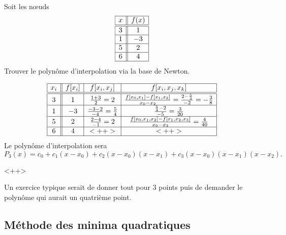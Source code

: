 \begin{example}

    Soit les nœuds
    \begin{equation*}
        \begin{array}[]{|c||c|}
            \hline
            x&f(x)\\
            \hline\hline
            3&1\\
            \hline
            1&-3\\
            \hline
            5&2\\
            \hline
            6&4\\
            \hline
        \end{array}
    \end{equation*}
    Trouver le polynôme d'interpolation via la base de Newton.


    \begin{equation*}
        \begin{array}[]{|c||c|c|c|}
            \hline
            x_i&f[x_i]&f[x_i,x_j]&f[x_i,x_j,x_k]\\
            \hline\hline
            3&1&\frac{ 1+3 }{ 2 }=2&\frac{ f[x_0,x_1]-f[x_1,x_2] }{ x_0-x_2 }=\frac{ 2-\frac{ 5 }{ 4 } }{ -2 }=-\frac{ 3 }{ 8 }\\
            \hline
            1&-3&\frac{ -3-2 }{ -4 }=\frac{ 5 }{ 4 }&\frac{ \frac{ 5 }{ 4 }-2 }{ -5 }=\frac{ 3 }{ 20 }\\
            \hline
            5&2&\frac{ 2-4 }{ -1 }=2&\frac{ f[x_0,x_1,x_2]-f[x_1,x_2,x_3] }{ x_0-x_3 }=\frac{ 4 }{ 40 }\\
            \hline
            6&4&<++>&<++>\\
            \hline
        \end{array}
    \end{equation*}
    Le polynôme d'interpolation sera
    \begin{equation}
        P_3(x)=c_0+c_1(x-x_0)+c_2(x-x_0)(x-x_1)+c_3(x-x_0)(x-x_1)(x-x_2).
    \end{equation}
    
\end{example}
<++>


Un exercice typique serait de donner tout pour \( 3\) points puis de demander le polynôme qui aurait un quatrième point.

\subsection{Méthode des minima quadratiques}

